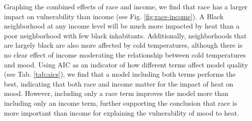 \documentclass[9pt,twoside,lineno]{pnas-new}
\begin{document}
Graphing the combined effects of race and income, we find that race has a larger impact on vulnerability than income (see Fig. \ref{fig:race-income}). A Black neighborhood at any income level will be much more impacted by heat than a poor neighborhood with few black inhabitants. Additionally, neighborhoods that are largely black are also more affected by cold temperatures, although there is no clear effect of income moderating the relationship between cold temperatures and mood. Using AIC as an indicator of how different terms affect model quality (see Tab. \ref{tab:aics}), we find that a model including both terms performs the best, indicating that both race and income matter for the impact of heat on mood. However, including only a race term improves the model more than including only an income term, further supporting the conclusion that race is more important than income for explaining the vulnerability of mood to heat.



\newpage
\end{document}
